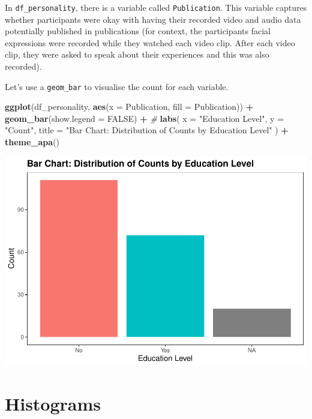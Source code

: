 \documentclass[
]{book}
\newenvironment{Shaded}{\begin{snugshade}}{\end{snugshade}}
\newcommand{\AttributeTok}[1]{\textcolor[rgb]{0.13,0.29,0.53}{#1}}
\newcommand{\CommentTok}[1]{\textcolor[rgb]{0.56,0.35,0.01}{\textit{#1}}}
\newcommand{\ConstantTok}[1]{\textcolor[rgb]{0.56,0.35,0.01}{#1}}
\newcommand{\FunctionTok}[1]{\textcolor[rgb]{0.13,0.29,0.53}{\textbf{#1}}}
\newcommand{\NormalTok}[1]{#1}
\newcommand{\SpecialCharTok}[1]{\textcolor[rgb]{0.81,0.36,0.00}{\textbf{#1}}}
\newcommand{\StringTok}[1]{\textcolor[rgb]{0.31,0.60,0.02}{#1}}
\begin{document}
In \texttt{df\_personality}, there is a variable called \texttt{Publication}. This variable captures whether participants were okay with having their recorded video and audio data potentially published in publications (for context, the participants facial expressions were recorded while they watched each video clip. After each video clip, they were asked to speak about their experiences and this was also recorded).

Let's use a \texttt{geom\_bar} to visualise the count for each variable.

\begin{Shaded}
\begin{Highlighting}[]
\FunctionTok{ggplot}\NormalTok{(df\_personality, }\FunctionTok{aes}\NormalTok{(}\AttributeTok{x =}\NormalTok{ Publication, }\AttributeTok{fill =}\NormalTok{ Publication)) }\SpecialCharTok{+}
  \FunctionTok{geom\_bar}\NormalTok{(}\AttributeTok{show.legend =} \ConstantTok{FALSE}\NormalTok{) }\SpecialCharTok{+} \CommentTok{\#}
  \FunctionTok{labs}\NormalTok{(}
    \AttributeTok{x =} \StringTok{"Education Level"}\NormalTok{,}
    \AttributeTok{y =} \StringTok{"Count"}\NormalTok{,}
    \AttributeTok{title =} \StringTok{"Bar Chart: Distribution of Counts by Education Level"}
\NormalTok{  ) }\SpecialCharTok{+}
  \FunctionTok{theme\_apa}\NormalTok{()}
\end{Highlighting}
\end{Shaded}

\includegraphics{rintro_demo_files/figure-latex/unnamed-chunk-324-1.pdf}

\hypertarget{histograms}{%
\section{Histograms}\label{histograms}}
\end{document}
